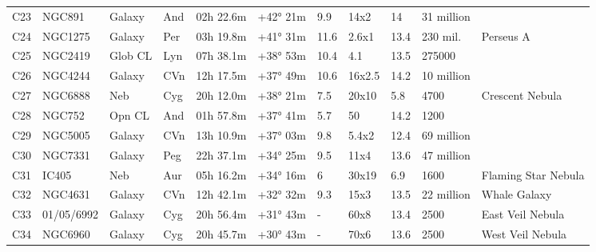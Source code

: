 \begin{table}[h]
\begin{tabular}{@{}lllllllllll@{}}
C23        & NGC891      & Galaxy     & And       & 02h 22.6m & +42° 21m  & 9.9       & 14x2                 & 14       & 31 million          &                                 \\
C24        & NGC1275     & Galaxy     & Per       & 03h 19.8m & +41° 31m  & 11.6      & 2.6x1                & 13.4     & 230 mil.            & Perseus A                       \\
C25        & NGC2419     & Glob CL    & Lyn       & 07h 38.1m & +38° 53m  & 10.4      & 4.1                  & 13.5     & 275000              &                                 \\
C26        & NGC4244     & Galaxy     & CVn       & 12h 17.5m & +37° 49m  & 10.6      & 16x2.5               & 14.2     & 10 million          &                                 \\
C27        & NGC6888     & Neb        & Cyg       & 20h 12.0m & +38° 21m  & 7.5       & 20x10                & 5.8      & 4700                & Crescent Nebula                 \\
C28        & NGC752      & Opn CL     & And       & 01h 57.8m & +37° 41m  & 5.7       & 50                   & 14.2     & 1200                &                                 \\
C29        & NGC5005     & Galaxy     & CVn       & 13h 10.9m & +37° 03m  & 9.8       & 5.4x2                & 12.4     & 69 million          &                                 \\
C30        & NGC7331     & Galaxy     & Peg       & 22h 37.1m & +34° 25m  & 9.5       & 11x4                 & 13.6     & 47 million          &                                 \\
C31        & IC405       & Neb        & Aur       & 05h 16.2m & +34° 16m  & 6         & 30x19                & 6.9      & 1600                & Flaming Star Nebula             \\
C32        & NGC4631     & Galaxy     & CVn       & 12h 42.1m & +32° 32m  & 9.3       & 15x3                 & 13.5     & 22 million          & Whale Galaxy                    \\
C33        & 01/05/6992  & Galaxy     & Cyg       & 20h 56.4m & +31° 43m  & -         & 60x8                 & 13.4     & 2500                & East Veil Nebula                \\
C34        & NGC6960     & Galaxy     & Cyg       & 20h 45.7m & +30° 43m  & -         & 70x6                 & 13.6     & 2500                & West Veil Nebula                \\

\end{tabular}
\end{table}
